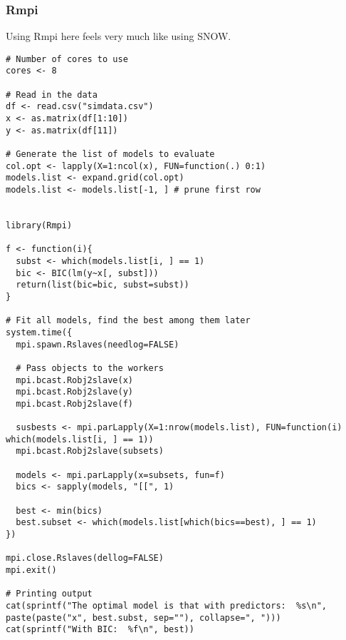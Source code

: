 \subsubsection{Rmpi}
Using Rmpi here feels very much like using SNOW.
\begin{lstlisting}[language=rr]
# Number of cores to use
cores <- 8

# Read in the data
df <- read.csv("simdata.csv")
x <- as.matrix(df[1:10])
y <- as.matrix(df[11])

# Generate the list of models to evaluate
col.opt <- lapply(X=1:ncol(x), FUN=function(.) 0:1)
models.list <- expand.grid(col.opt)
models.list <- models.list[-1, ] # prune first row


library(Rmpi)

f <- function(i){
  subst <- which(models.list[i, ] == 1)
  bic <- BIC(lm(y~x[, subst]))
  return(list(bic=bic, subst=subst))
}

# Fit all models, find the best among them later
system.time({
  mpi.spawn.Rslaves(needlog=FALSE)

  # Pass objects to the workers
  mpi.bcast.Robj2slave(x)
  mpi.bcast.Robj2slave(y)
  mpi.bcast.Robj2slave(f)

  susbests <- mpi.parLapply(X=1:nrow(models.list), FUN=function(i) which(models.list[i, ] == 1))
  mpi.bcast.Robj2slave(subsets)
  
  models <- mpi.parLapply(x=subsets, fun=f)
  bics <- sapply(models, "[[", 1)
  
  best <- min(bics)
  best.subset <- which(models.list[which(bics==best), ] == 1)
})

mpi.close.Rslaves(dellog=FALSE)
mpi.exit()

# Printing output
cat(sprintf("The optimal model is that with predictors:  %s\n", paste(paste("x", best.subst, sep=""), collapse=", ")))
cat(sprintf("With BIC:  %f\n", best))
\end{lstlisting}


